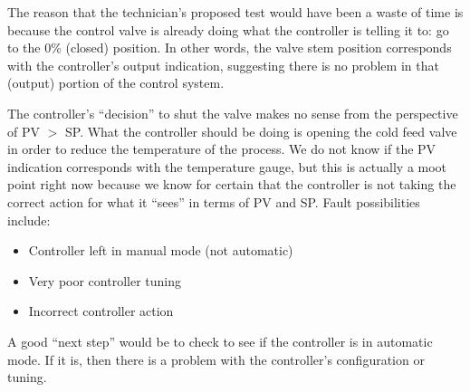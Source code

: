 





The reason that the technician's proposed test would have been a waste of time is because the control valve is already doing what the controller is telling it to: go to the 0\% (closed) position.  In other words, the valve stem position corresponds with the controller's output indication, suggesting there is no problem in that (output) portion of the control system.
 
\vskip 10pt

The controller's ``decision'' to shut the valve makes no sense from the perspective of PV $>$ SP.  What the controller should be doing is opening the cold feed valve in order to reduce the temperature of the process.  We do not know if the PV indication corresponds with the temperature gauge, but this is actually a moot point right now because we know for certain that the controller is not taking the correct action for what it ``sees'' in terms of PV and SP.  Fault possibilities include:

\begin{itemize}
\item{} Controller left in manual mode (not automatic)
\item{} Very poor controller tuning
\item{} Incorrect controller action
\end{itemize}

A good ``next step'' would be to check to see if the controller is in automatic mode.  If it is, then there is a problem with the controller's configuration or tuning.











